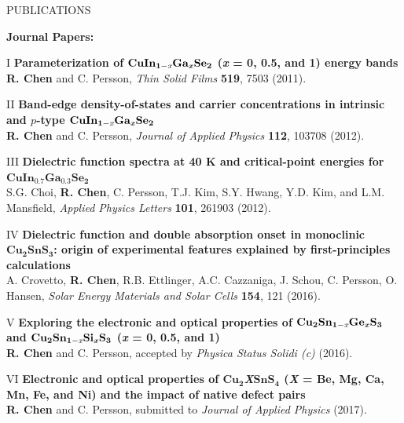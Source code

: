 \documentclass{resume} %
\begin{document}
\newpage
\begin{rSection}{PUBLICATIONS}

\textbf{Journal Papers:}
 



I \textbf{Parameterization of $\mathbf {CuIn_{1-\textit{x}}Ga_\textbf{\textit{x}}Se_2}$ (\textbf{\textit{x}} = 0, 0.5, and 1) energy bands}
\\\textbf{R. Chen} and C. Persson, \textit{Thin Solid Films} {\textbf {519}}, 7503 (2011).



II \textbf{Band-edge density-of-states and carrier concentrations in intrinsic and $p$-type $\mathbf {CuIn_{1-\textit{x}}Ga_\textbf{\textit{x}}Se_2}$}
\\\textbf{R. Chen} and C. Persson, \textit{Journal of Applied Physics} {\textbf {112}}, 103708 (2012).

III \textbf{Dielectric function spectra at 40 K and critical-point energies for $\mathbf {CuIn_{0.7}Ga_{0.3}Se_2}$}
\\ S.G. Choi, \textbf{R. Chen}, C. Persson, T.J. Kim, S.Y. Hwang, Y.D. Kim, and L.M. Mansfield,
\textit{Applied Physics Letters} {\textbf {101}}, 261903 (2012).

IV \textbf{Dielectric function and double absorption onset in monoclinic $\mathbf {Cu_{2}SnS_{3}}$: origin of experimental features explained by first-principles calculations}
\\ A. Crovetto, \textbf{R. Chen}, R.B. Ettlinger, A.C. Cazzaniga, J. Schou, C. Persson, O. Hansen,
\textit{Solar Energy Materials and Solar Cells} {\textbf {154}}, 121 (2016).

V \textbf{Exploring the electronic and optical properties of $\mathbf {Cu_{2}Sn_{1-\textit{x}}Ge_\textbf{\textit{x}}S_{3}}$ and $\mathbf {Cu_{2}Sn_{1-\textit{x}}Si_\textbf{\textit{x}}S_{3}}$ (\textbf{\textit{x}} = 0, 0.5, and 1)}
\\ \textbf{R. Chen} and C. Persson, accepted by \textit{Physica Status Solidi (c)} (2016).

VI \textbf{Electronic and optical properties of $\mathbf {Cu_{2}}$\textbf{\textit{X}}$\mathbf {SnS_{4}}$ (\textbf{\textit{X}} = Be, Mg, Ca, Mn, Fe, and Ni) and the impact of native defect pairs}
\\ \textbf{R. Chen} and C. Persson, submitted to \textit{Journal of Applied Physics} (2017).


\end{rSection}
\end{document}
